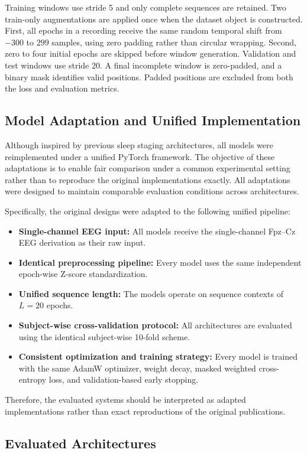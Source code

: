 \documentclass[conference]{IEEEtran}
\begin{document}
Training windows use stride 5 and only complete sequences are retained. Two train-only augmentations are applied once when the dataset object is constructed. First, all epochs in a recording receive the same random temporal shift from $-300$ to $299$ samples, using zero padding rather than circular wrapping. Second, zero to four initial epochs are skipped before window generation. Validation and test windows use stride 20. A final incomplete window is zero-padded, and a binary mask identifies valid positions. Padded positions are excluded from both the loss and evaluation metrics.

\subsection{Model Adaptation and Unified Implementation}

Although inspired by previous sleep staging architectures, all models were reimplemented under a unified PyTorch framework. The objective of these adaptations is to enable fair comparison under a common experimental setting rather than to reproduce the original implementations exactly. All adaptations were designed to maintain comparable evaluation conditions across architectures.

Specifically, the original designs were adapted to the following unified pipeline:
\begin{itemize}
    \item \textbf{Single-channel EEG input:} All models receive the single-channel Fpz--Cz EEG derivation as their raw input.
    \item \textbf{Identical preprocessing pipeline:} Every model uses the same independent epoch-wise Z-score standardization.
    \item \textbf{Unified sequence length:} The models operate on sequence contexts of $L=20$ epochs.
    \item \textbf{Subject-wise cross-validation protocol:} All architectures are evaluated using the identical subject-wise 10-fold scheme.
    \item \textbf{Consistent optimization and training strategy:} Every model is trained with the same AdamW optimizer, weight decay, masked weighted cross-entropy loss, and validation-based early stopping.
\end{itemize}
Therefore, the evaluated systems should be interpreted as adapted implementations rather than exact reproductions of the original publications.

\subsection{Evaluated Architectures}
\end{document}
